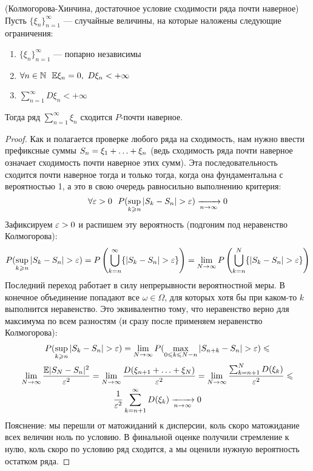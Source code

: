 \begin{theorem} (Колмогорова-Хинчина, достаточное условие сходимости ряда почти наверное)
	Пусть $\{\xi_n\}_{n = 1}^\infty$ --- случайные величины, на которые наложены следующие ограничения:
	\begin{enumerate}
		\item $\{\xi_n\}_{n = 1}^\infty$ --- попарно независимы
		
		\item $\forall n \in \N\ \ \E\xi_n = 0,\ D\xi_n < +\infty$
		
		\item $\sum_{n = 1}^\infty D\xi_n < +\infty$
	\end{enumerate}
	Тогда ряд $\sum_{n = 1}^\infty \xi_n$ сходится $P$-почти наверное.
\end{theorem}

\begin{proof}
	Как и полагается проверке любого ряда на сходимость, нам нужно ввести префиксные суммы $S_n = \xi_1 + \ldots + \xi_n$ (ведь сходимость ряда почти наверное означает сходимость почти наверное этих сумм). Эта последовательность сходится почти наверное тогда и только тогда, когда она фундаментальна с вероятностью 1, а это в свою очередь равносильно выполнению критерия:
	\[
		\forall \varepsilon > 0\ \ P(\sup_{k \geqslant n} |S_k - S_n| > \varepsilon) \xrightarrow[n \to \infty]{} 0
	\]
	Зафиксируем $\varepsilon > 0$ и распишем эту вероятность (подгоним под неравенство Колмогорова):
	\[
		P(\sup_{k \geqslant n} |S_k - S_n| > \varepsilon) = P\left(\bigcup_{k = n}^\infty \{|S_k - S_n| > \varepsilon\}\right) = \lim_{N \to \infty} P\left(\bigcup_{k = n}^N \{|S_k - S_n| > \varepsilon\}\right)
	\]
	Последний переход работает в силу непрерывности вероятностной меры. В конечное объединение попадают все $\omega \in \Omega$, для которых хотя бы при каком-то $k$ выполнится неравенство. Это эквивалентно тому, что неравенство верно для максимума по всем разностям (и сразу после применяем неравенство Колмогорова):
	\begin{multline*}
		P(\sup_{k \geqslant n} |S_k - S_n| > \varepsilon) = \lim_{N \to \infty} P(\max_{0 \leqslant k \leqslant N - n} |S_{n + k} - S_n| > \varepsilon) \leqslant
		\\
		\lim_{N \to \infty} \frac{\mathbb{E} |S_N - S_n|^2}{\varepsilon^2} = \lim_{N \to \infty} \frac{D(\xi_{n + 1} + \ldots + \xi_N)}{\varepsilon^2} = \lim_{N \to \infty} \frac{\sum_{k = n + 1}^N D(\xi_k)}{\varepsilon^2} \leqslant
		\\
		\frac{1}{\varepsilon^2} \sum_{k = n + 1}^\infty D(\xi_k) \xrightarrow[n \to \infty]{} 0
	\end{multline*}
	Пояснение: мы перешли от матожиданий к дисперсии, коль скоро матожидание всех величин ноль по условию. В финальной оценке получили стремление к нулю, коль скоро по условию ряд сходится, а мы оценили нужную вероятность остатком ряда.
\end{proof}

